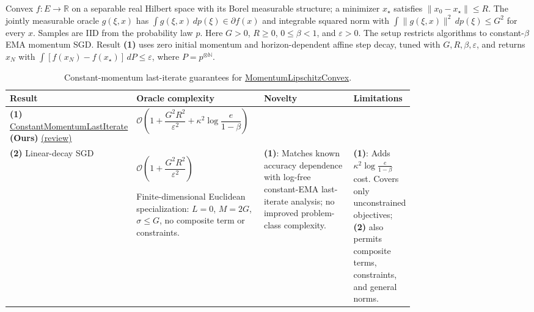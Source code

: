 \begin{table}[tp]
\centering
\caption{Constant-momentum last-iterate guarantees for \href{https://github.com/k3nfalt/longtails/blob/main/LongTails/Setups/MomentumLipschitzConvex.lean}{MomentumLipschitzConvex}.}\label{tab:MomentumLipschitzConvex}
\parbox{\linewidth}{\footnotesize Convex $f:E\to\mathbb R$ on a separable real Hilbert space with its Borel measurable structure; a minimizer $x_\star$ satisfies $\|x_0-x_\star\|\le R$. The jointly measurable oracle $g(\xi,x)$ has $\int g(\xi,x)\,dp(\xi)\in\partial f(x)$ and integrable squared norm with $\int\|g(\xi,x)\|^2\,dp(\xi)\le G^2$ for every $x$. Samples are IID from the probability law $p$. Here $G>0$, $R\ge0$, $0\le\beta<1$, and $\varepsilon>0$. The setup restricts algorithms to constant-$\beta$ EMA momentum SGD. Result \textbf{(1)} uses zero initial momentum and horizon-dependent affine step decay, tuned with $G,R,\beta,\varepsilon$, and returns $x_N$ with $\int[f(x_N)-f(x_\star)]\,dP\le\varepsilon$, where $P=p^{\otimes\mathbb N}$.}\par\smallskip
\begin{threeparttable}
\footnotesize
\setlength{\tabcolsep}{4pt}\renewcommand{\arraystretch}{1.25}
\begin{tabularx}{\linewidth}{@{}>{\raggedright\arraybackslash}p{0.20\linewidth}>{\raggedright\arraybackslash}p{0.32\linewidth}>{\raggedright\arraybackslash}p{0.25\linewidth}>{\raggedright\arraybackslash}X@{}}
\toprule
\textbf{Result} & \textbf{Oracle complexity} & \textbf{Novelty} & \textbf{Limitations} \\
\midrule
\textbf{(1)} \href{https://github.com/k3nfalt/longtails/blob/main/LongTails/Theorems/ConstantMomentumLastIterate.lean}{Constant\allowbreak Momentum\allowbreak Last\allowbreak Iterate} \textbf{(Ours)} \href{https://github.com/k3nfalt/longtails/blob/main/scripts/reviews/ConstantMomentumLastIterate.md}{(review)}
& $\mathcal{O}\!\left(1+\dfrac{G^2R^2}{\varepsilon^2}+\kappa^2\log\dfrac{e}{1-\beta}\right)$ & & \\
\midrule[1.2pt]
\textbf{(2)} Linear-decay SGD \citep[Thm.~3.4]{bscLiuZhou2026}
& $\mathcal{O}\!\left(1+\dfrac{G^2R^2}{\varepsilon^2}\right)$\par Finite-dimensional Euclidean specialization: $L=0$, $M=2G$, $\sigma\le G$, no composite term or constraints.
& \textbf{(1)}: Matches known accuracy dependence with log-free constant-EMA last-iterate analysis; no improved problem-class complexity.
& \textbf{(1)}: Adds $\kappa^2\log\!\frac{e}{1-\beta}$ cost. Covers only unconstrained objectives; \textbf{(2)} also permits composite terms, constraints, and general norms. \\

\end{tabularx}
\end{threeparttable}
\end{table}
